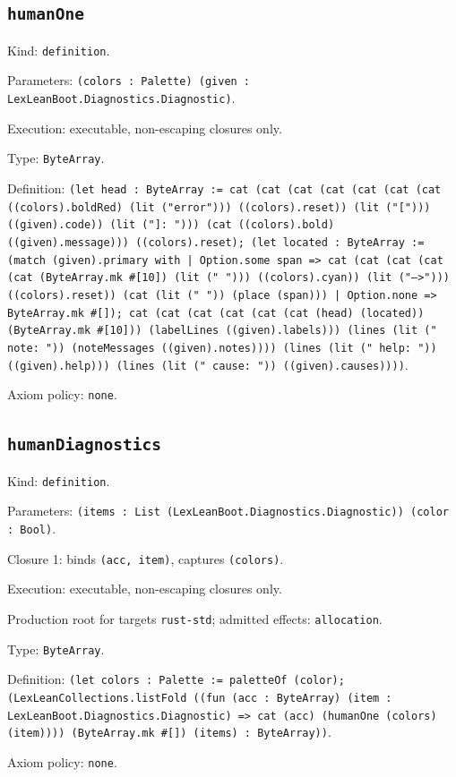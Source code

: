 \documentclass[11pt]{article}
\begin{document}
\subsection*{\texttt{humanOne}}
\noindent Kind: \texttt{definition}.\par
\noindent Parameters: \texttt{(colors : Palette) (given : LexLeanBoot.Diagnostics.Diagnostic)}.\par
\noindent Execution: executable, non-escaping closures only.\par
\noindent Type: \texttt{ByteArray}.\par
\noindent Definition: \texttt{(let head : ByteArray := cat (cat (cat (cat (cat (cat (cat ((colors).boldRed) (lit ("error"))) ((colors).reset)) (lit ("["))) ((given).code)) (lit ("]: "))) (cat ((colors).bold) ((given).message))) ((colors).reset); (let located : ByteArray := (match (given).primary with | Option.some span => cat (cat (cat (cat (cat (ByteArray.mk \#[10]) (lit ("  "))) ((colors).cyan)) (lit ("-->"))) ((colors).reset)) (cat (lit (" ")) (place (span))) | Option.none => ByteArray.mk \#[]); cat (cat (cat (cat (cat (cat (head) (located)) (ByteArray.mk \#[10])) (labelLines ((given).labels))) (lines (lit ("  note: ")) (noteMessages ((given).notes)))) (lines (lit ("  help: ")) ((given).help))) (lines (lit ("  cause: ")) ((given).causes))))}.\par
\noindent Axiom policy: \texttt{none}.\par
\subsection*{\texttt{humanDiagnostics}}
\noindent Kind: \texttt{definition}.\par
\noindent Parameters: \texttt{(items : List (LexLeanBoot.Diagnostics.Diagnostic)) (color : Bool)}.\par
\noindent Closure 1: binds \texttt{(acc, item)}, captures \texttt{(colors)}.\par
\noindent Execution: executable, non-escaping closures only.\par
\noindent Production root for targets \texttt{rust-std}; admitted effects: \texttt{allocation}.\par
\noindent Type: \texttt{ByteArray}.\par
\noindent Definition: \texttt{(let colors : Palette := paletteOf (color); (LexLeanCollections.listFold ((fun (acc : ByteArray) (item : LexLeanBoot.Diagnostics.Diagnostic) => cat (acc) (humanOne (colors) (item)))) (ByteArray.mk \#[]) (items) : ByteArray))}.\par
\noindent Axiom policy: \texttt{none}.\par
\end{document}
